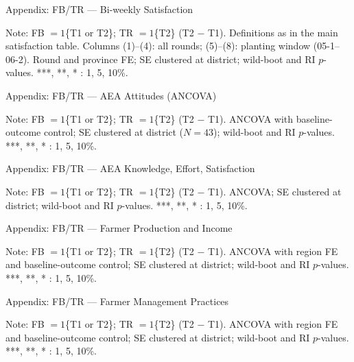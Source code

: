 \documentclass[aspectratio=169]{beamer}
\begin{document}
\begin{frame}{Appendix: FB/TR --- Bi-weekly Satisfaction}
	\centering
	\scalebox{0.46}{}
	\begin{tablenotes}
		\scriptsize
		\item Note: FB $=1$\{T1 or T2\}; TR $=1$\{T2\} (T2 $-$ T1). Definitions as in the main
		satisfaction table. Columns (1)--(4): all rounds; (5)--(8): planting window (05-1--06-2).
		Round and province FE; SE clustered at district; wild-boot and RI $p$-values.
		***, **, * : 1, 5, 10\%.
	\end{tablenotes}
\end{frame}

\begin{frame}{Appendix: FB/TR --- AEA Attitudes (ANCOVA)}
	\centering
	\scalebox{0.62}{}
	\begin{tablenotes}
		\scriptsize
		\item Note: FB $=1$\{T1 or T2\}; TR $=1$\{T2\} (T2 $-$ T1). ANCOVA with baseline-outcome
		control; SE clustered at district ($N=43$); wild-boot and RI $p$-values. ***, **, * : 1, 5, 10\%.
	\end{tablenotes}
\end{frame}

\begin{frame}{Appendix: FB/TR --- AEA Knowledge, Effort, Satisfaction}
	\centering
	\scalebox{0.65}{}
	\begin{tablenotes}
		\scriptsize
		\item Note: FB $=1$\{T1 or T2\}; TR $=1$\{T2\} (T2 $-$ T1). ANCOVA; SE clustered at
		district; wild-boot and RI $p$-values. ***, **, * : 1, 5, 10\%.
	\end{tablenotes}
\end{frame}

\begin{frame}{Appendix: FB/TR --- Farmer Production and Income}
	\centering
	\scalebox{0.46}{}
	\begin{tablenotes}
		\scriptsize
		\item Note: FB $=1$\{T1 or T2\}; TR $=1$\{T2\} (T2 $-$ T1). ANCOVA with region FE and
		baseline-outcome control; SE clustered at district; wild-boot and RI $p$-values.
		***, **, * : 1, 5, 10\%.
	\end{tablenotes}
\end{frame}

\begin{frame}{Appendix: FB/TR --- Farmer Management Practices}
	\centering
	\scalebox{0.5}{}
	\begin{tablenotes}
		\scriptsize
		\item Note: FB $=1$\{T1 or T2\}; TR $=1$\{T2\} (T2 $-$ T1). ANCOVA with region FE and
		baseline-outcome control; SE clustered at district; wild-boot and RI $p$-values.
		***, **, * : 1, 5, 10\%.
	\end{tablenotes}
\end{frame}
\end{document}
